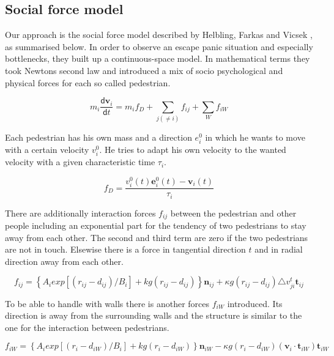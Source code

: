 \documentclass[11pt]{article}
\begin{document}
\subsection{Social force model }
Our approach is the social force model described by Helbling, Farkas and Vicsek \cite{EscapePanic}, as summarised below. In order to observe an escape panic situation and especially bottlenecks, they built up a continuous-space model. In mathematical terms they took Newtons second law and introduced a mix of socio psychological and physical forces for each so called pedestrian. 

\begin{equation}
m_{i}\frac{\mathsf{d}\mathbf{v}_{i}}{\mathsf{d}t}=m_{i}f_{D}+\sum \limits_{j(\neq{i})}{f_{ij}}+\sum \limits_{W}{f_{iW}}
\end{equation}

Each pedestrian has his own mass and a direction $e_i^0$ in which he wants to move with a certain velocity $v_i^0$. He tries to adapt his own velocity to the wanted velocity with a given characteristic time $\tau_i$.

\begin{equation}
f_{D}=\frac{v_{i}^{0}(t)\mathbf{e}_{i}^{0}(t)-\mathbf{v}_{i}(t)}{\tau_{i}}
\end{equation}

There are additionally interaction forces $f_{ij}$ between the pedestrian and other people including an exponential part for the tendency of two pedestrians to stay away from each other. The second and third term are zero if the two pedestrians are not in touch. Elsewise there is a force in tangential direction $t$ and in radial direction away from each other. 

\begin{equation}
f_{ij} = \left\{A_{i}exp[(r_{ij}-d_{ij})/B_{i}]+kg(r_{ij}-d_{ij})\right\}\mathbf{n}_{ij}+\kappa g(r_{ij}-d_{ij})\triangle v_{ji}^t\mathbf{t}_{ij}
\end{equation}

To be able to handle with walls there is another forces $f_{iW}$ introduced. Its direction is away from the surrounding walls and the structure is similar to the one for the interaction between pedestrians.

\begin{equation}
f_{iW}=\left\{A_{i}exp[(r_{i}-d_{iW})/B_{i}]+kg(r_{i}-d_{iW})\right\}\mathbf{n}_{iW}-\kappa g(r_{i}-d_{iW})(\mathbf{v}_{i}\cdot\mathbf{t}_{iW})\mathbf{t}_{iW}
\end{equation}
\newpage
\end{document}
